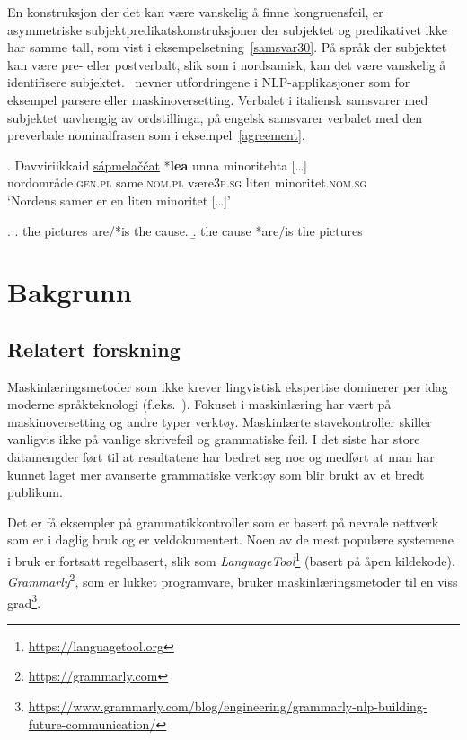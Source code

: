 \documentclass{flammie}
\begin{document}
En konstruksjon der det kan være vanskelig å finne kongruensfeil, er
asymmetriske subjektpredikats\-konstruksjoner der subjektet og predikativet ikke
har samme tall, som vist i eksempelsetning~\ref{samsvar30}. På språk der
subjektet kan være pre- eller postverbalt, slik som i nordsamisk, kan det være
vanskelig å identifisere subjektet.~\cite{Lorusso2019asymmetries} nevner
utfordringene i NLP-applikasjoner som for eksempel parsere eller
maskinoversetting. Verbalet i italiensk samsvarer med subjektet uavhengig av
ordstillinga, på engelsk samsvarer verbalet med den preverbale nominalfrasen som
i eksempel~\ref{agreement}.~\cite{Lorusso2019asymmetries}

\exg. Davviriikkaid \underline{sápmelaččat} *\textbf{lea} unna minoritehta [\ldots]\label{samsvar30}\\
nordområde\textsc{.gen.pl} same\textsc{.nom.pl} være\textsc{3p.sg} liten minoritet\textsc{.nom.sg}\\
`Nordens samer er en liten minoritet [\ldots]'

\ex. \label{agreement}
\a.  the pictures are/*is the cause.
\b.  the cause *are/is the pictures

\section{Bakgrunn}

\subsection{Relatert forskning}

Maskinlæringsmetoder som ikke krever lingvistisk ekspertise dominerer per idag
moderne språkteknologi (f.eks.~\cite{chollampatt2018multilayer,boyd2018using}).
Fokuset i maskinlæring har vært på maskinoversetting og andre typer verktøy.
Maskinlærte stavekontroller skiller vanligvis ikke på vanlige skrivefeil og
grammatiske feil.  I det siste har store datamengder ført til at resultatene har
bedret seg noe og medført at man har kunnet laget mer avanserte grammatiske
verktøy som blir brukt av et bredt publikum.

Det er få eksempler på grammatikkontroller som er basert på nevrale nettverk som
er i daglig bruk og er veldokumentert. Noen av de mest populære systemene i bruk
er fortsatt regelbasert, slik som
\textit{LanguageTool}\footnote{\url{https://languagetool.org}} (basert på åpen
kildekode). \textit{Grammarly}\footnote{\url{https://grammarly.com}}, som er
lukket programvare, bruker maskinlæringsmetoder til en viss
grad\footnote{\url{https://www.grammarly.com/blog/engineering/grammarly-nlp-building-future-communication/}}.
\end{document}
